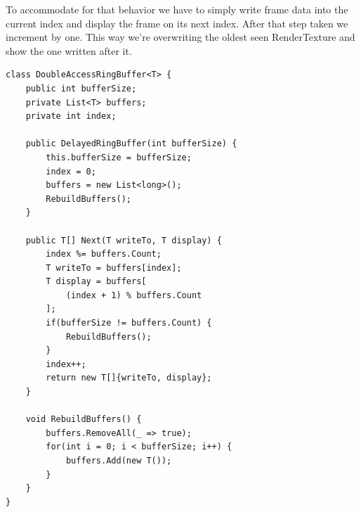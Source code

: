 To accommodate for that behavior we have to simply write frame data into the 
current index and display the frame on its next index. After that step taken we 
increment by one. This way we’re overwriting the oldest seen RenderTexture and 
show the one written after it.

\begin{lstlisting}
class DoubleAccessRingBuffer<T> {
	public int bufferSize;
	private List<T> buffers;
	private int index;
	
	public DelayedRingBuffer(int bufferSize) {
		this.bufferSize = bufferSize;
		index = 0;
		buffers = new List<long>();
		RebuildBuffers();
	}
	
	public T[] Next(T writeTo, T display) {
		index %= buffers.Count;
		T writeTo = buffers[index];
		T display = buffers[
			(index + 1) % buffers.Count
		];
		if(bufferSize != buffers.Count) {
			RebuildBuffers();
		}
		index++;
		return new T[]{writeTo, display};
	}
	
	void RebuildBuffers() {
		buffers.RemoveAll(_ => true);
		for(int i = 0; i < bufferSize; i++) {
			buffers.Add(new T());
		}
	}
}
\end{lstlisting}

